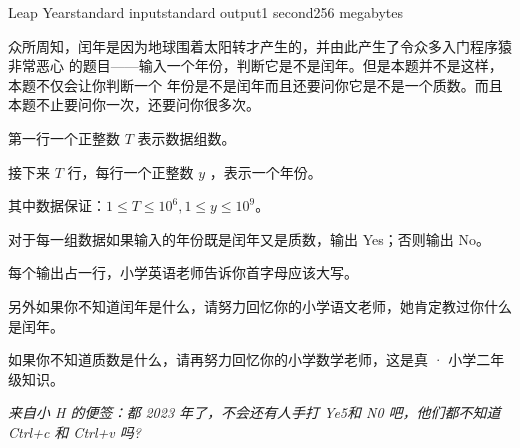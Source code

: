 \documentclass[12pt,a4paper,oneside]{article}
\begin{document}
    \begin{problem}{Leap Year}{standard input}{standard output}{1 second}{256 megabytes}
	
    	
        众所周知，闰年是因为地球围着太阳转才产生的，并由此产生了令众多入门程序猿非常恶心
        的题目——输入一个年份，判断它是不是闰年。但是本题并不是这样，本题不仅会让你判断一个
        年份是不是闰年而且还要问你它是不是一个质数。而且本题不止要问你一次，还要问你很多次。
        \InputFile

        第一行一个正整数 $T$ 表示数据组数。
        
        接下来 $T$ 行，每行一个正整数 $y$ ，表示一个年份。
        
        其中数据保证：$1 \le T \le 10^6, 1 \le y \le 10^9$。
        
        \OutputFile
	对于每一组数据如果输入的年份既是闰年又是质数，输出 Yes；否则输出 No。
 
        每个输出占一行，小学英语老师告诉你首字母应该大写。
	\Example
	
	\begin{example}
	\end{example}

        \Note
        另外如果你不知道闰年是什么，请努力回忆你的小学语文老师，她肯定教过你什么是闰年。
        
        如果你不知道质数是什么，请再努力回忆你的小学数学老师，这是真 · 小学二年级知识。
        
\textit{来自小 H 的便签：都 2023 年了，不会还有人手打 Ye5和 N0 吧，他们都不知道 Ctrl+c 和 Ctrl+v
吗?}
	\end{problem}
\end{document}
